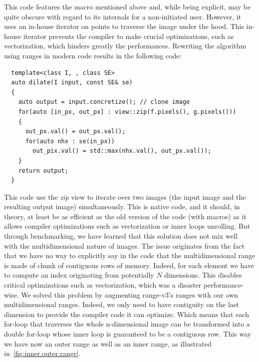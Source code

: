 This code features the macro mentioned above and, while being explicit, may be quite obscure with regard to its
internals for a non-initiated user. However, it uses an  in-house iterator on points to traverse the image under the
hood. This in-house iterator prevents the compiler to make crucial optimizations, such as vectorization, which hinders
greatly the performances. Rewriting the algorithm using ranges in modern code results in the following code:
\begin{verbatim}
  template<class I, , class SE>
  auto dilate(I input, const SE& se)
  {
    auto output = input.concretize(); // clone image
    for(auto [in_px, out_px] : view::zip(f.pixels(), g.pixels()))
    {
      out_px.val() = out_px.val();
      for(auto nhx : se(in_px))
        out_pix.val() = std::max(nhx.val(), out_px.val());
    }
    return output;
  }
\end{verbatim}
This code use the \emph{zip} view to iterate over two images (the input image and the resulting output image)
simultaneously. This is native code, and it should, in theory, at least be as  efficient as the old version of the code
(with macros) as it allows compiler optimizations such as vectorization or inner loops unrolling. But through
benchmarking, we have learned that this solution does not mix well~\parencite{austern.2000.segmented} with the
multidimensional nature of images. The issue originates from the fact that we have no way to explicitly say in the code
that the multidimensional range is made of chunk of contiguous rows of memory. Indeed, for each element we have to
compute an index originating from potentially \(N\) dimensions. This disables critical optimizations such as
vectorization, which was a disaster performance-wise. We solved this problem by augmenting range-v3's ranges with our
own multidimensional ranges. Indeed, we only need to have contiguity on the last dimension to provide the compiler code
it can optimize. Which means that each for-loop that traverses the whole n-dimensional image can be transformed into a
double for-loop whose inner loop is guaranteed to be a contiguous row. This way we have now an outer range as well as an
inner range, as illustrated in~\cref{fig:inner.outer.range}.

